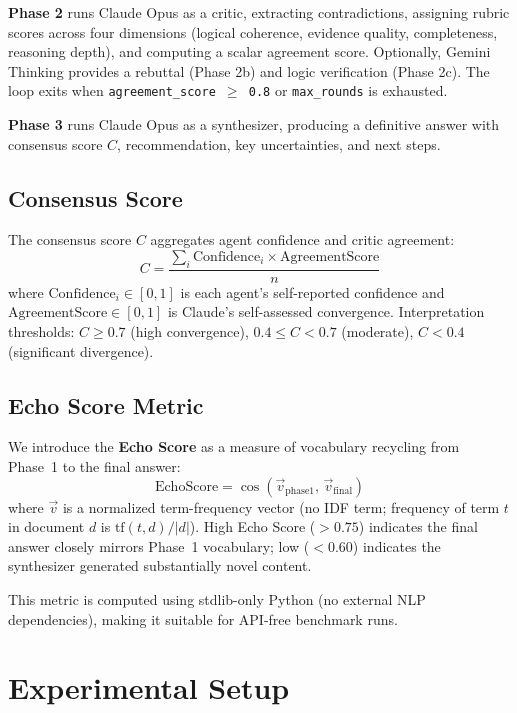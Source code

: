 \documentclass[11pt]{article}
\begin{document}
\textbf{Phase 2} runs Claude Opus as a critic, extracting contradictions, assigning rubric scores across four dimensions (logical coherence, evidence quality, completeness, reasoning depth), and computing a scalar agreement score. Optionally, Gemini Thinking provides a rebuttal (Phase 2b) and logic verification (Phase 2c). The loop exits when \texttt{agreement\_score $\geq$ 0.8} or \texttt{max\_rounds} is exhausted.

\textbf{Phase 3} runs Claude Opus as a synthesizer, producing a definitive answer with consensus score $C$, recommendation, key uncertainties, and next steps.

\subsection{Consensus Score}

The consensus score $C$ aggregates agent confidence and critic agreement:
\begin{equation}
C = \frac{\sum_{i} \text{Confidence}_i \times \text{AgreementScore}}{n}
\label{eq:consensus}
\end{equation}
where $\text{Confidence}_i \in [0,1]$ is each agent's self-reported confidence and $\text{AgreementScore} \in [0,1]$ is Claude's self-assessed convergence. Interpretation thresholds: $C \geq 0.7$ (high convergence), $0.4 \leq C < 0.7$ (moderate), $C < 0.4$ (significant divergence).

\subsection{Echo Score Metric}

We introduce the \textbf{Echo Score} as a measure of vocabulary recycling from Phase~1 to the final answer:
\begin{equation}
\text{EchoScore} = \cos\!\left(\vec{v}_{\text{phase1}},\, \vec{v}_{\text{final}}\right)
\label{eq:echo}
\end{equation}
where $\vec{v}$ is a normalized term-frequency vector (no IDF term; frequency of term $t$ in document $d$ is $\text{tf}(t,d) / |d|$). High Echo Score ($> 0.75$) indicates the final answer closely mirrors Phase~1 vocabulary; low ($< 0.60$) indicates the synthesizer generated substantially novel content.

This metric is computed using stdlib-only Python (no external NLP dependencies), making it suitable for API-free benchmark runs.

\section{Experimental Setup}
\label{sec:experiments}
\end{document}
